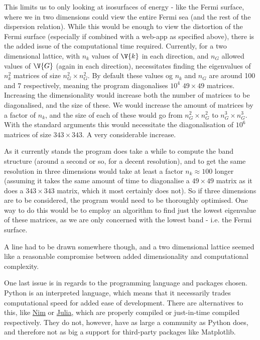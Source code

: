 \documentclass[main.tex]{subfiles}
\begin{document}
	This limits us to only looking at isosurfaces of energy - like the Fermi surface, where we in two dimensions could view the entire Fermi sea (and the rest of the dispersion relation). While this would be  enough to view the distortion of the Fermi surface (especially if combined with a web-app as specified above), there is the added issue of the computational time required. Currently, for a two dimensional lattice, with $ n_k $ values of $ \V{k} $ in each direction, and $ n_G $ allowed values of $ \V{G} $ (again in each direction), necessitates finding the eigenvalues of $ n_k^2 $ matrices of size $ n_G^2 \times n_G^2 $. By default these values og $ n_k $ and $ n_G $ are around 100 and 7 respectively, meaning the program diagonalises $ 10^4 $ $ 49\times 49 $ matrices. Increasing the dimensionality would increase both the number of matrices to be diagonalised, and the size of these. We would increase the amount of matrices by a factor of $ n_k $, and the size of each of these would go from $ n_G^2 \times n_G^2$ to $ n_G^3 \times n_G^3 $. With the standard arguments this would necessitate the diagonalisation of $ 10^6 $ matrices of size $ 343 \times 343 $. A very considerable increase.
	
	As it currently stands the program does take a while to compute the band structure (around a second or so, for a decent resolution), and to get the same resolution in three dimensions would take at least a factor $ n_k \approx 100 $ longer (assuming it takes the same amount of time to diagonalise a $ 49 \times 49 $ matrix as it does a $ 343 \times 343 $ matrix, which it most certainly does not). So if three dimensions are to be considered, the program would need to be thoroughly optimised. One way to do this would be to employ an algorithm to find just the lowest eigenvalue of these matrices, as we are only concerned with the lowest band - i.e. the Fermi surface. 
	
	A line had to be drawn somewhere though, and a two dimensional lattice seemed like a reasonable compromise between added dimensionality and computational complexity.
	
	One last issue is in regards to the programming language and packages chosen. Python is an interpreted language, which means that it necessarily trades computational speed for added ease of development. There are alternatives to this, like \href{https://nim-lang.org/}{Nim} or \href{https://julialang.org/}{Julia}, which are properly compiled or just-in-time compiled respectively. They do not, however, have as large a community as Python does, and therefore not as big a support for third-party packages like Matplotlib.
	
\end{document}
